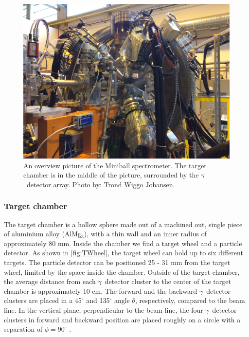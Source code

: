 \documentclass[twoside,english]{uiofysmaster/uiofysmaster}
\newcommand{\ga}{$\gamma$}
\let\orgautoref\autoref
\renewcommand{\autoref}
        {%
		 \def\sectionautorefname{Section}%
		 \def\subsectionautorefname{Section}%
		 \def\subsubsectionautorefname{Section}%
		 \def\chapterautorefname{Chapter}%
          \orgautoref}
\begin{document}
\begin{figure}[ht]
	\centering
	\includegraphics[width=\linewidth]{Images/IMG3849.JPG}
	\caption{An overview picture of the Miniball spectrometer. The target chamber is in the middle of the picture, surrounded by the \ga\ detector array. Photo by: Trond Wiggo Johansen.}
	\label{fig:MBSpect}
\end{figure}


\subsubsection{Target chamber}
The target chamber is a hollow sphere made out of a machined out, single piece of aluminium alloy (AlMg$_3$), with a thin wall and an inner radius of approximately 80 mm. 
Inside the chamber we find a target wheel and a particle detector. 
As shown in \autoref{fig:TWheel}, the target wheel can hold up to six different targets. 
The particle detector can be positioned 25 - 31 mm from the target wheel, limited by the space inside the chamber. 
Outside of the target chamber, the average distance from each \ga\ detector cluster to the center of the target chamber is approximately 10 cm.
The forward and the backward \ga\ detector clusters are placed in a 45$^\circ$ and 135$^\circ$ angle $\theta$, respectively, compared to the beam line.
In the vertical plane, perpendicular to the beam line, the four \ga\ detector clusters in forward and backward position are placed roughly on a circle with a separation of $\phi = 90^\circ$ \cite{MB-spect}.  
\end{document}
